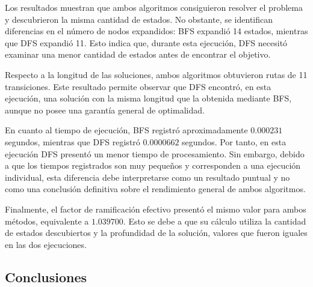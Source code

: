 \documentclass[
  spanish,
]{llncs}
\begin{document}
Los resultados muestran que ambos algoritmos consiguieron resolver el
problema y descubrieron la misma cantidad de estados. No obstante, se
identifican diferencias en el número de nodos expandidos: BFS expandió
14 estados, mientras que DFS expandió 11. Esto indica que, durante esta
ejecución, DFS necesitó examinar una menor cantidad de estados antes de
encontrar el objetivo.

Respecto a la longitud de las soluciones, ambos algoritmos obtuvieron
rutas de 11 transiciones. Este resultado permite observar que DFS
encontró, en esta ejecución, una solución con la misma longitud que la
obtenida mediante BFS, aunque no posee una garantía general de
optimalidad.

En cuanto al tiempo de ejecución, BFS registró aproximadamente
\(0.000231\) segundos, mientras que DFS registró \(0.0000662\) segundos.
Por tanto, en esta ejecución DFS presentó un menor tiempo de
procesamiento. Sin embargo, debido a que los tiempos registrados son muy
pequeños y corresponden a una ejecución individual, esta diferencia debe
interpretarse como un resultado puntual y no como una conclusión
definitiva sobre el rendimiento general de ambos algoritmos.

Finalmente, el factor de ramificación efectivo presentó el mismo valor
para ambos métodos, equivalente a \(1.039700\). Esto se debe a que su
cálculo utiliza la cantidad de estados descubiertos y la profundidad de
la solución, valores que fueron iguales en las dos ejecuciones.

\subsection{Conclusiones}\label{conclusiones}
\end{document}
